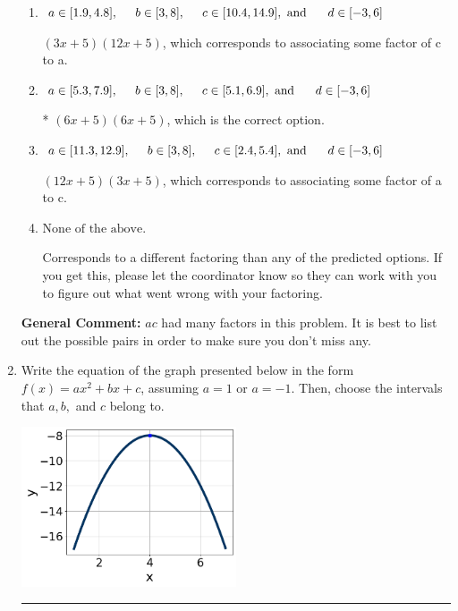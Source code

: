 \documentclass{extbook}[14pt]
\newcommand{\litem}[1]{\item #1

\rule{\textwidth}{0.4pt}}
\begin{document}
\begin{enumerate}
{\begin{enumerate}[label=\Alph*.]
 $(x + 30)(x + 30)$, which corresponds to factoring $x^{2} +60 x + 900$.
\item \( a \in [1.9, 4.8], \hspace*{5mm} b \in [3, 8], \hspace*{5mm} c \in [10.4, 14.9], \text{ and } \hspace*{5mm} d \in [-3, 6] \)

 $(3x + 5)(12x + 5)$, which corresponds to associating some factor of c to a.
\item \( a \in [5.3, 7.9], \hspace*{5mm} b \in [3, 8], \hspace*{5mm} c \in [5.1, 6.9], \text{ and } \hspace*{5mm} d \in [-3, 6] \)

* $(6x + 5)(6x + 5)$, which is the correct option.
\item \( a \in [11.3, 12.9], \hspace*{5mm} b \in [3, 8], \hspace*{5mm} c \in [2.4, 5.4], \text{ and } \hspace*{5mm} d \in [-3, 6] \)

 $(12x + 5)(3x + 5)$, which corresponds to associating some factor of a to c.
\item \( \text{None of the above.} \)

 Corresponds to a different factoring than any of the predicted options. If you get this, please let the coordinator know so they can work with you to figure out what went wrong with your factoring.
\end{enumerate}

\textbf{General Comment:} $ac$ had many factors in this problem. It is best to list out the possible pairs in order to make sure you don't miss any.
}
\litem{
Write the equation of the graph presented below in the form $f(x)=ax^2+bx+c$, assuming  $a=1$ or $a=-1$. Then, choose the intervals that $a, b,$ and $c$ belong to.

\begin{center}
    \includegraphics[width=0.5\textwidth]{../Figures/quadraticGraphToEquationB.png}
\end{center}


}
\end{enumerate}
\end{document}
